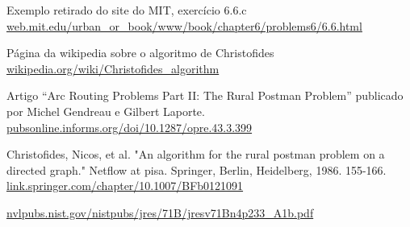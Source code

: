 \documentclass[12pt, a4paper]{article}
\begin{document}
\begin{thebibliography}{9}
    Exemplo retirado do site do MIT, exercício 6.6.c\\
    \href{http://web.mit.edu/urban_or_book/www/book/chapter6/problems6/6.6.html}{web.mit.edu/urban\_or\_book/www/book/chapter6/problems6/6.6.html} 

    Página da wikipedia sobre o algoritmo de Christofides\\
    \href{https://en.wikipedia.org/wiki/Christofides_algorithm}{wikipedia.org/wiki/Christofides\_algorithm}

    Artigo ``Arc Routing Problems Part II: The Rural Postman Problem'' publicado por Michel Gendreau e Gilbert Laporte.
    \href{https://pubsonline.informs.org/doi/10.1287/opre.43.3.399}{pubsonline.informs.org/doi/10.1287/opre.43.3.399}


    Christofides, Nicos, et al. "An algorithm for the rural postman problem on a directed graph." Netflow at pisa. Springer, Berlin, Heidelberg, 1986. 155-166.\\
    \href{https://link.springer.com/chapter/10.1007/BFb0121091}{link.springer.com/chapter/10.1007/BFb0121091}


    \href{https://nvlpubs.nist.gov/nistpubs/jres/71B/jresv71Bn4p233_A1b.pdf<Paste>}{nvlpubs.nist.gov/nistpubs/jres/71B/jresv71Bn4p233\_A1b.pdf}    
	\end{thebibliography}
 
\end{document}
